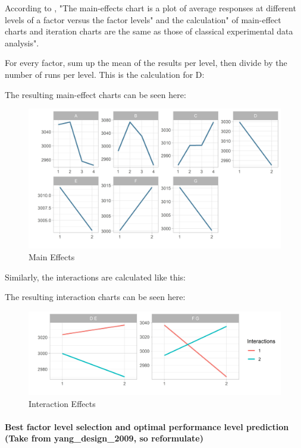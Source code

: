 According to \cite{yang_design_2009}, "The main-effects chart is a plot of average responses at different levels of a factor versus the factor levels" and the calculation" of main-effect charts and iteration charts are the same as those of classical experimental data analysis".

For every factor, sum up the mean of the results per level, then divide by the number of runs per level. This is the calculation for D:

The resulting main-effect charts can be seen here:
\begin{figure}[H] 
	\label{figure:taguchi:main_effects}
	\includegraphics[width=1\linewidth]{simulations/taguchi/plots/main_effects}
	\caption{Main Effects}
\end{figure}



Similarly, the interactions are calculated like this:


The resulting interaction charts can be seen here:
\begin{figure}[H] 
	\label{figure:taguchi:interaction_effects}
	\includegraphics[width=1\linewidth]{simulations/taguchi/plots/interaction_effects}
	\caption{Interaction Effects}
\end{figure}


\paragraph{Best factor level selection and optimal performance level prediction (Take from yang\_design\_2009, so reformulate)}
